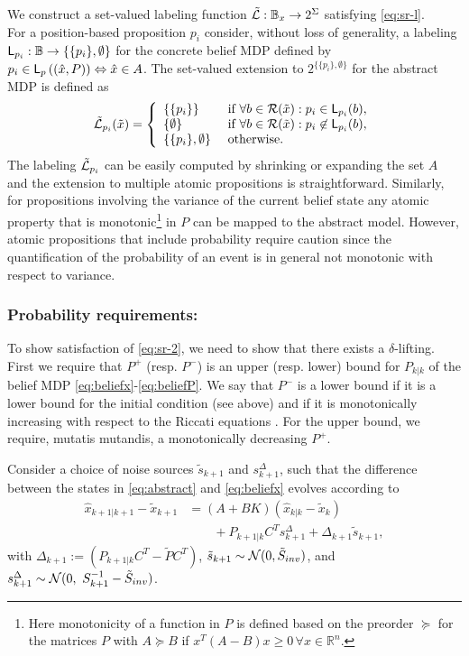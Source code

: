 \documentclass{ifacconf}
\begin{document}
We construct a set-valued labeling function  $\tilde {\mathcal{L}}: \mathbb{B}_{x}\rightarrow 2^\Sigma$ satisfying \eqref{eq:sr-l}.
\\
For a position-based proposition $p_i$ consider, without loss of generality, a labeling $\mathsf{L}_{p_i}: \mathbb{B}\rightarrow \{\{p_i\},\emptyset\}$ for the concrete belief MDP defined by $p_i\in\mathsf{L}_p \left( (\hat x,P) \right)  \Leftrightarrow \hat x \in A$. The set-valued extension to $2^{\{\{p_i\},\emptyset\}}$ for the abstract MDP is defined as
 \begin{align}
 	\tilde {\mathcal{L}}_{p_i}(\tilde x) =\left\{\begin{array}{ll} \{\{p_i\}\} & \mbox{ if } \forall b \in \mathcal{R} (\tilde x):p_i\in\mathsf{L}_{p_i}(b), \\
 	  \{\emptyset \} & \mbox{ if } \forall b\in \mathcal{R} (\tilde x):{p_i}\not\in\mathsf{L}_{p_i}(b),\\
 	  \{\{p_i\},\emptyset\}&\mbox{ otherwise.}\end{array} \right.
 \end{align}
The labeling $\tilde {\mathcal{L}}_{p_i}$ can be easily computed by shrinking or expanding the set $A$ and the extension to multiple atomic propositions is straightforward. Similarly, for propositions involving the variance of the current belief state any atomic property that is monotonic\footnote{Here monotonicity of a function in $P$ is defined based on the preorder $\succeq $ for the matrices $P$ with $A\succeq B$ if $x^T(A-B)x\geq0\, \forall x\in\mathbb R^n$. } in $P$ can be mapped to the abstract model. However, atomic propositions that include probability require caution since the quantification of the probability of an event is in general not monotonic with respect to variance.


\subsubsection{Probability requirements:}
To show satisfaction of \eqref{eq:sr-2}, we need to show that there exists a $\delta$-lifting. First we require that $P^+$ (resp. $P^-$) is an upper (resp. lower) bound for $P_{k|k}$ of the belief MDP \eqref{eq:beliefx}-\eqref{eq:beliefP}.  We say that $P^-$ is a lower bound if it is a lower bound for the initial condition (see above) and   if it is monotonically increasing with respect to the Riccati equations \citep{bitmead1985monotonicity}. For the upper bound, we require, mutatis mutandis, a monotonically decreasing $P^+$.


Consider a choice of noise sources $\tilde{{s}}_{k+1}$ and $s^\Delta_{k+1}$, such that the difference between the states in \eqref{eq:abstract} and \eqref{eq:beliefx} evolves according to
\begin{equation}
\begin{aligned}
 \hat x_{k+1|k+1}-  \tilde x_{k+1}&=(A+BK)(\hat x_{k|k}-\tilde x_{k})  \\ & \qquad + P_{k+1|k}C^T s^\Delta_{k+1}+\Delta_{k+1} {\tilde{s}}_{k+1},
\end{aligned}
\end{equation}
with $\Delta_{k+1}:=(P_{k+1|k}C^T-  \tilde P C^T)$, $ \tilde{{s}}_{k+1}\sim \mathcal{N} (0,\tilde{S}_{inv})$, and $ {s}^\Delta_{k+1}\sim  \mathcal{N} (0,\  S_{k+1}^{-1}-\tilde{S}_{inv})$. 
\end{document}
